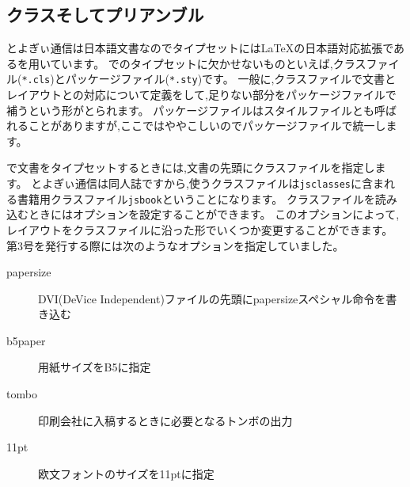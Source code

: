 \subsection{クラスそしてプリアンブル}

とよぎぃ通信は日本語文書なのでタイプセットには{\LaTeX}の日本語対応拡張である{\pLaTeX}を用いています。
{\pLaTeX}でのタイプセットに欠かせないものといえば,クラスファイル(\texttt{*.cls})とパッケージファイル(\texttt{*.sty})です。
一般に,クラスファイルで文書とレイアウトとの対応について定義をして,足りない部分をパッケージファイルで補うという形がとられます。
パッケージファイルはスタイルファイルとも呼ばれることがありますが,ここではややこしいのでパッケージファイルで統一します。

{\pLaTeX}で文書をタイプセットするときには,文書の先頭にクラスファイルを指定します。
とよぎぃ通信は同人誌ですから,使うクラスファイルは\texttt{jsclasses}に含まれる書籍用クラスファイル\texttt{jsbook}ということになります。
クラスファイルを読み込むときにはオプションを設定することができます。
このオプションによって,レイアウトをクラスファイルに沿った形でいくつか変更することができます。
第3号を発行する際には次のようなオプションを指定していました。
\begin{description}
	\item[papersize] DVI(DeVice Independent)ファイルの先頭にpapersizeスペシャル命令を書き込む
	\item[b5paper] 用紙サイズをB5に指定
	\item[tombo] 印刷会社に入稿するときに必要となるトンボの出力
	\item[11pt] 欧文フォントのサイズを11ptに指定
\end{description}

